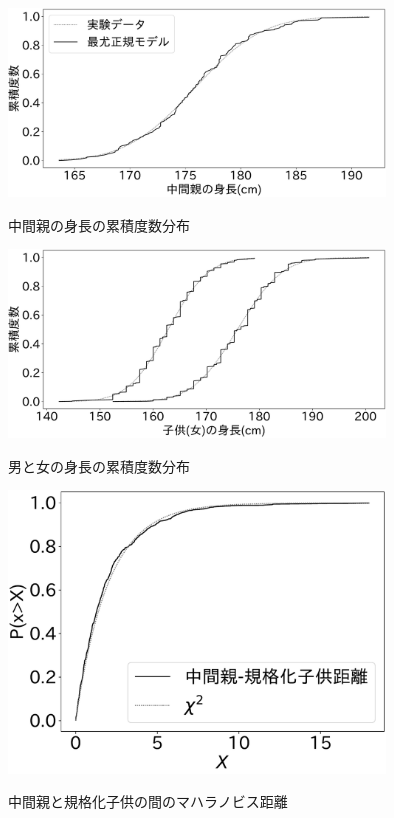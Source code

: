 \begin{figure}
 \begin{center}
  \includegraphics[width=10cm]{./image/16_/Galton/midparent_cumhist.pdf}
  \label{fig:Galton_midparent_cumhist}
  \caption{中間親の身長の累積度数分布}
 \end{center}
\end{figure}

\begin{figure}
 \begin{center}
  \includegraphics[width=10cm]{./image/16_/Galton/male_female_cumhist.pdf}
  \label{fig:Galton_male_female_cumhist}
  \caption{男と女の身長の累積度数分布}
 \end{center}
\end{figure}


\begin{figure}
 \begin{center}
  \includegraphics[width=10cm]{./image/16_/Galton/Galton_Mahalanobis_distance_distribution.pdf}
  \label{fig:Galton_Mahalanobis_distance_distribution} \caption{中間親と規格化子供の間のマハラノビス距離}
 \end{center}
\end{figure}

